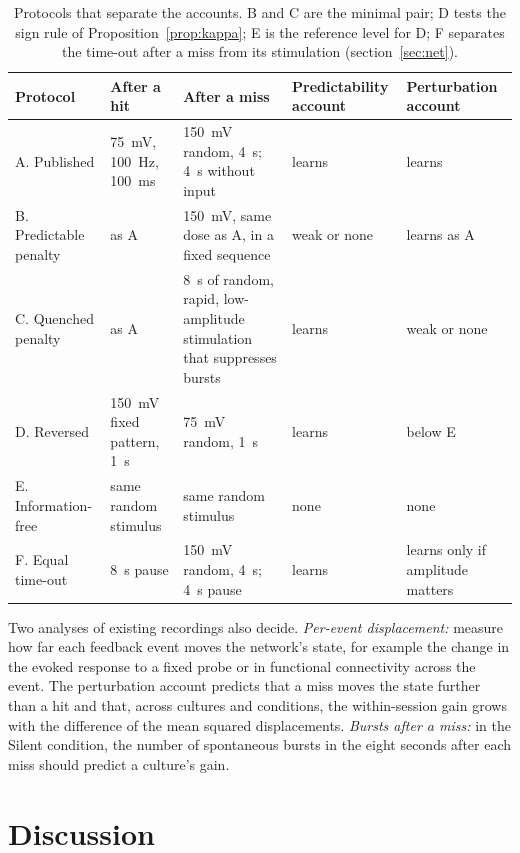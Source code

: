 \documentclass[12pt]{article}
\numberwithin{equation}{section}
\begin{document}
\begin{table}[t]
\centering
\small
\singlespacing
\renewcommand{\arraystretch}{1.15}
\begin{tabular}{>{\raggedright}p{2.3cm}>{\raggedright}p{2.5cm}>{\raggedright}p{3.6cm}>{\raggedright}p{2.5cm}>{\raggedright\arraybackslash}p{2.5cm}}
\toprule
Protocol & After a hit & After a miss & Predictability account & Perturbation account \\
\midrule
A. Published & 75~mV, 100~Hz, 100~ms & 150~mV random, 4~s; 4~s without input & learns & learns \\
B. Predictable penalty & as A & 150~mV, same dose as A, in a fixed sequence & weak or none & learns as A \\
C. Quenched penalty & as A & 8~s of random, rapid, low-amplitude stimulation that suppresses bursts & learns & weak or none \\
D. Reversed & 150~mV fixed pattern, 1~s & 75~mV random, 1~s & learns & below E \\
E. Information-free & same random stimulus & same random stimulus & none & none \\
F. Equal time-out & 8~s pause & 150~mV random, 4~s; 4~s pause & learns & learns only if amplitude matters \\
\bottomrule
\end{tabular}
\caption{Protocols that separate the accounts. B and C are the minimal pair; D tests the sign rule of Proposition~\ref{prop:kappa}; E is the reference level for D; F separates the time-out after a miss from its stimulation (section~\ref{sec:net}).}
\label{tab:exp}
\end{table}

Two analyses of existing recordings also decide. \emph{Per-event displacement:} measure how far each feedback event moves the network's state, for example the change in the evoked response to a fixed probe or in functional connectivity across the event. The perturbation account predicts that a miss moves the state further than a hit and that, across cultures and conditions, the within-session gain grows with the difference of the mean squared displacements. \emph{Bursts after a miss:} in the Silent condition, the number of spontaneous bursts in the eight seconds after each miss should predict a culture's gain.

\section{Discussion}
\end{document}
